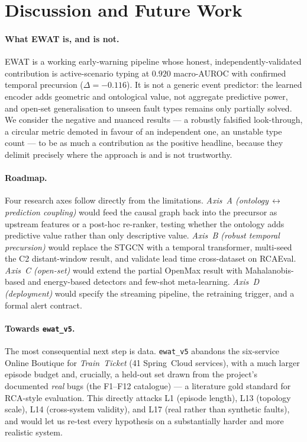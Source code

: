 \section{Discussion and Future Work}
\label{sec:discussion}

\paragraph{What EWAT is, and is not.}
EWAT is a working early-warning pipeline whose honest, independently-validated contribution is
active-scenario typing at $0.920$ macro-AUROC with confirmed temporal precursion
($\Delta=-0.116$). It is not a generic event predictor: the learned encoder adds geometric and
ontological value, not aggregate predictive power, and open-set generalisation to unseen fault
types remains only partially solved. We consider the negative and nuanced results --- a robustly
falsified look-through, a circular metric demoted in favour of an independent one, an unstable type
count --- to be as much a contribution as the positive headline, because they delimit precisely
where the approach is and is not trustworthy.

\paragraph{Roadmap.}
Four research axes follow directly from the limitations.
\emph{Axis~A (ontology$\,\leftrightarrow\,$prediction coupling)} would feed the causal graph back
into the precursor as upstream features or a post-hoc re-ranker, testing whether the ontology adds
predictive value rather than only descriptive value.
\emph{Axis~B (robust temporal precursion)} would replace the STGCN with a temporal transformer,
multi-seed the C2 distant-window result, and validate lead time cross-dataset on RCAEval.
\emph{Axis~C (open-set)} would extend the partial OpenMax result with Mahalanobis-based and
energy-based detectors and few-shot meta-learning.
\emph{Axis~D (deployment)} would specify the streaming pipeline, the retraining trigger, and a
formal alert contract.

\paragraph{Towards \texttt{ewat\_v5}.}
The most consequential next step is data. \texttt{ewat\_v5} abandons the six-service Online Boutique
for \emph{Train~Ticket} (41 Spring~Cloud services), with a much larger episode budget and, crucially,
a held-out set drawn from the project's documented \emph{real} bugs (the F1--F12 catalogue) ---
a literature gold standard for RCA-style evaluation. This directly attacks L1 (episode length),
L13 (topology scale), L14 (cross-system validity), and L17 (real rather than synthetic faults),
and would let us re-test every hypothesis on a substantially harder and more realistic system.
